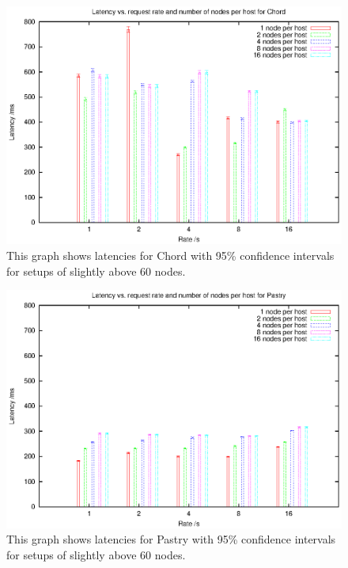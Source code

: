 \begin{figure}[!htb]
  \begin{center}
    \includegraphics[width=0.9\linewidth]{illustrations/latency_chord.eps}
    \caption{This graph shows latencies for Chord with 95\% confidence intervals for setups of slightly above 60 nodes.}
    \label{figChordLatency}
  \end{center}
\end{figure}

\begin{figure}[!htb]
  \begin{center}
    \includegraphics[width=0.9\linewidth]{illustrations/latency_pastry.eps}
    \caption{This graph shows latencies for Pastry with 95\% confidence intervals for setups of slightly above 60 nodes.}
    \label{figPastryLatency}
  \end{center}
\end{figure}

